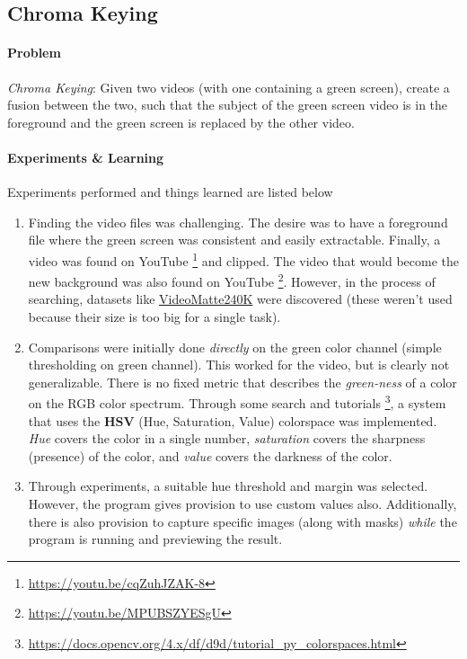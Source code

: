 \subsection{Chroma Keying}

\paragraph{Problem}
\emph{Chroma Keying}: Given two videos (with one containing a green screen), create a fusion between the two, such that the subject of the green screen video is in the foreground and the green screen is replaced by the other video.

\paragraph{Experiments \& Learning}
Experiments performed and things learned are listed below

\begin{enumerate}
    \item Finding the video files was challenging. The desire was to have a foreground file where the green screen was consistent and easily extractable. Finally, a video was found on YouTube \footnote{\url{https://youtu.be/cqZuhJZAK-8}} and clipped. The video that would become the new background was also found on YouTube \footnote{\url{https://youtu.be/MPUBSZYESgU}}. However, in the process of searching, datasets like \href{https://grail.cs.washington.edu/projects/background-matting-v2/#/datasets}{VideoMatte240K} were discovered (these weren't used because their size is too big for a single task).
    \item Comparisons were initially done \emph{directly} on the green color channel (simple thresholding on green channel). This worked for the video, but is clearly not generalizable. There is no fixed metric that describes the \emph{green-ness} of a color on the RGB color spectrum. Through some search and tutorials \footnote{\url{https://docs.opencv.org/4.x/df/d9d/tutorial_py_colorspaces.html}}, a system that uses the \textbf{HSV} (Hue, Saturation, Value) colorspace was implemented. \emph{Hue} covers the color in a single number, \emph{saturation} covers the sharpness (presence) of the color, and \emph{value} covers the darkness of the color.
    \item Through experiments, a suitable hue threshold and margin was selected. However, the program gives provision to use custom values also. Additionally, there is also provision to capture specific images (along with masks) \emph{while} the program is running and previewing the result.
\end{enumerate}

